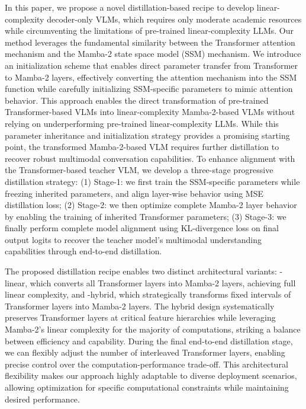 In this paper, we propose a novel distillation-based recipe to develop linear-complexity decoder-only VLMs, which requires only moderate academic resources while circumventing the limitations of pre-trained linear-complexity LLMs.
Our method leverages the fundamental similarity between the Transformer attention mechanism and the Mamba-2 state space model (SSM) mechanism. We introduce an initialization scheme that enables direct parameter transfer from Transformer to Mamba-2 layers, effectively converting the attention mechanism into the SSM function while carefully initializing SSM-specific parameters to mimic attention behavior. This approach enables the direct transformation of pre-trained Transformer-based VLMs into linear-complexity Mamba-2-based VLMs without relying on underperforming pre-trained linear-complexity LLMs.
While this parameter inheritance and initialization strategy provides a promising starting point, the transformed Mamba-2-based VLM requires further distillation to recover robust multimodal conversation capabilities. To enhance alignment with the Transformer-based teacher VLM, we develop a three-stage progressive distillation strategy:
(1) Stage-1: we first train the SSM-specific parameters while freezing inherited parameters, and align layer-wise behavior using MSE distillation loss; 
(2) Stage-2: we then optimize complete Mamba-2 layer behavior by enabling the training of inherited Transformer parameters; 
(3) Stage-3: we finally perform complete model alignment using KL-divergence loss on final output logits to recover the teacher model's multimodal understanding capabilities through end-to-end distillation.


The proposed distillation recipe enables two distinct architectural variants: \name{}-linear, which converts all Transformer layers into Mamba-2 layers, achieving full linear complexity, and \name{}-hybrid, which strategically transforms fixed intervals of Transformer layers into Mamba-2 layers. The hybrid design systematically preserves Transformer layers at critical feature hierarchies while leveraging Mamba-2's linear complexity for the majority of computations, striking a balance between efficiency and capability. 
During the final end-to-end distillation stage, we can flexibly adjust the number of interleaved Transformer layers, enabling precise control over the computation-performance trade-off. This architectural flexibility makes our approach highly adaptable to diverse deployment scenarios, allowing optimization for specific computational constraints while maintaining desired performance.



